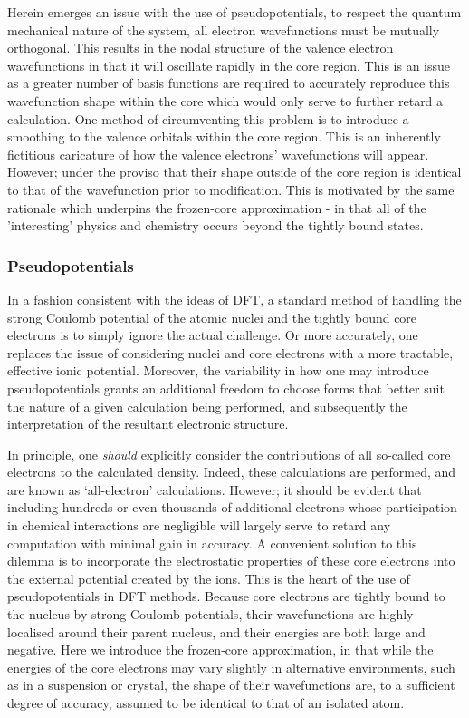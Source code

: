 Herein emerges an issue with the use of pseudopotentials, to respect the quantum mechanical nature of the system, all electron wavefunctions must be mutually orthogonal. This results in the nodal structure of the valence electron wavefunctions in that it will oscillate rapidly in the core region. This is an issue as a greater number of basis functions are required to accurately reproduce this wavefunction shape within the core which would only serve to further retard a calculation. One method of circumventing this problem is to introduce a smoothing to the valence orbitals within the core region. This is an inherently fictitious caricature of how the valence electrons' wavefunctions will appear. However; under the proviso that their shape outside of the core region is identical to that of the wavefunction prior to modification. This is motivated by the same rationale which underpins the frozen-core approximation - in that all of the 'interesting' physics and chemistry occurs beyond the tightly bound states. 


\subsubsection{Pseudopotentials}
\label{sec:Ps}
In a fashion consistent with the ideas of DFT, a standard method of handling the strong Coulomb potential of the atomic nuclei and the tightly bound core electrons is to simply ignore the actual challenge. Or more accurately, one replaces the issue of considering nuclei and core electrons with a more tractable, effective ionic potential. Moreover, the variability in how one may introduce pseudopotentials grants an additional freedom to choose forms that better suit the nature of a given calculation being performed, and subsequently the interpretation of the resultant electronic structure.

In principle, one \textit{should} explicitly consider the contributions of all so-called core electrons to the calculated density. Indeed, these calculations are performed, and are known as `all-electron' calculations. However; it should be evident that including hundreds or even thousands of additional electrons whose participation in chemical interactions are negligible will largely serve to retard any computation with minimal gain in accuracy. A convenient solution to this dilemma is to incorporate the electrostatic properties of these core electrons into the external potential created by the ions. This is the heart of the use of pseudopotentials in DFT methods. Because core electrons are tightly bound to the nucleus by strong Coulomb potentials, their wavefunctions are highly localised around their parent nucleus, and their energies are both large and negative. Here we introduce the frozen-core approximation, in that while the energies of the core electrons may vary slightly in alternative environments, such as in a  suspension or crystal, the shape of their wavefunctions are, to a sufficient degree of accuracy, assumed to be identical to that of an isolated atom. 

